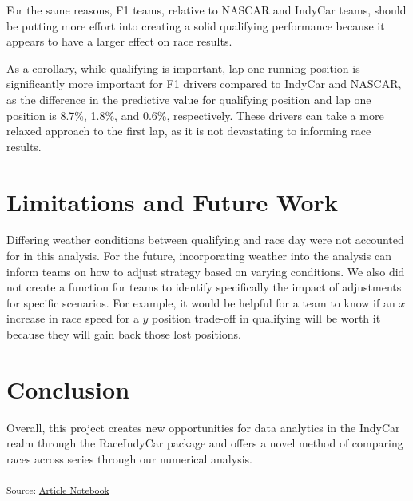 \documentclass[
  10pt]{article}
\begin{document}
For the same reasons, F1 teams, relative to NASCAR and IndyCar teams,
should be putting more effort into creating a solid qualifying
performance because it appears to have a larger effect on race results.

As a corollary, while qualifying is important, lap one running position
is significantly more important for F1 drivers compared to IndyCar and
NASCAR, as the difference in the predictive value for qualifying
position and lap one position is 8.7\%, 1.8\%, and 0.6\%, respectively.
These drivers can take a more relaxed approach to the first lap, as it
is not devastating to informing race results.

\section{Limitations and Future Work}\label{limitations-and-future-work}

Differing weather conditions between qualifying and race day were not
accounted for in this analysis. For the future, incorporating weather
into the analysis can inform teams on how to adjust strategy based on
varying conditions. We also did not create a function for teams to
identify specifically the impact of adjustments for specific scenarios.
For example, it would be helpful for a team to know if an \(x\) increase
in race speed for a \(y\) position trade-off in qualifying will be worth
it because they will gain back those lost positions.

\section{Conclusion}\label{conclusion}

Overall, this project creates new opportunities for data analytics in
the IndyCar realm through the RaceIndyCar package and offers a novel
method of comparing races across series through our numerical analysis.

\textsubscript{Source:
\href{https://ArchithSharma.github.io/raceindycar_manuscript/index.qmd.html}{Article
Notebook}}



\end{document}
